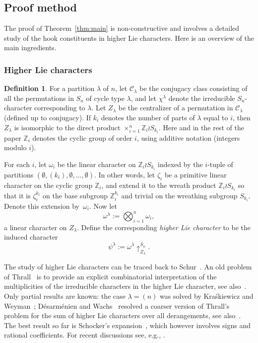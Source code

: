 \documentclass[10pt]{article}
\theoremstyle{definition}
\newtheorem{definition}[theorem]{Definition}
\newcommand{\C}{\mathcal C}
\def\ZZ{{\mathbb Z}}
\begin{document}
\subsection{Proof method} 
	
The proof of Theorem~\ref{thm:main} is non-constructive and   
involves a detailed study of the hook constituents in higher Lie characters.
Here is an overview of the main ingredients.


\subsubsection{Higher Lie characters}

\begin{definition}\label{def:higher}
For a partition $\lambda$ of $n$, let $\C_\lambda$ be the conjugacy class consisting of all the permutations in $S_n$ of cycle type $\lambda$,
and let $\chi^\lambda$ denote the irreducible $S_n$-character corresponding to $\lambda$.
Let $Z_\lambda$ be the centralizer of a permutation in $\C_\lambda$ (defined up to conjugacy). 
If $k_i$ denotes the number of parts of $\lambda$ equal to $i$, then $Z_\lambda$ is isomorphic to the direct	product $\times_{i=1}^n \ZZ_i\wr S_{k_i}$.
Here and in the rest of the paper $\ZZ_i$ denotes the cyclic group of order $i$, using additive notation (integers modulo $i$).
	
For each $i$, let $\omega_i$ be the linear character on $\ZZ_i\wr S_{k_i}$ indexed by the
$i$-tuple of partitions $(\emptyset, (k_i), \emptyset,
\dots,\emptyset)$. 
In other words, let $\zeta_i$ be a primitive linear character on the cyclic group $\ZZ_i$, and extend it to the wreath product $\ZZ_i\wr S_{k_i}$ so that it is $\zeta_i^{k_i}$
on the base subgroup $\ZZ_i^{k_i}$ and trivial on the wreathing subgroup $S_{k_i}$. Denote this extension by~$\omega_i$.
Now let
\[
\omega^\lambda := \bigotimes_{i=1}^n \omega_i,
\]
a linear character on $Z_\lambda$. 
Define the corresponding {\em higher Lie character} to be the induced character
\[
\psi^\lambda := \omega^\lambda\uparrow_{Z_\lambda}^{S_n}.
\]
\end{definition}

The study of higher Lie characters can be traced back 
to Schur~\cite{schur}. 
An old problem of Thrall~\cite{thrall} 
is to provide an explicit combinatorial interpretation of the 
multiplicities of the irreducible characters in the higher Lie character,
see also~\cite[Exercise~7.89(i)]{EC2}.
Only partial results are known: the case $\lambda = (n)$ was solved by Kra\'skiewicz and Weyman~\cite{KraskiewiczWeyman};
D\'esarm\'enien and Wachs~\cite{DesarmenienWachs} resolved a coarser version of Thrall's problem 
for the sum of higher Lie characters over all  
derangements, see also~\cite{ReinerWebb}. 
The best result so far is
Schocker's expansion~\cite[Theorem~3.1]{schocker}, which however involves signs and rational coefficients. 
For recent discussions see, e.g., \cite{Reiner, AS, Sundaram}.
\end{document}
